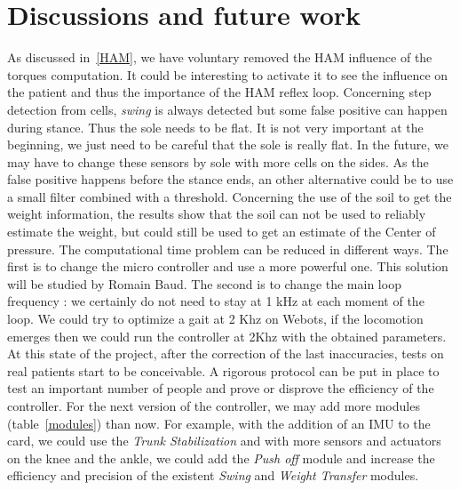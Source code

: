 \documentclass[a4paper,12pt]{article}
\begin{document}
\section{Discussions and future work}

As discussed in~\ref{HAM}, we have voluntary removed the HAM influence of the torques computation. It could be interesting to activate it to see the influence on the patient and thus the importance of the HAM reflex loop.
\medbreak
Concerning step detection from cells, \textit{swing} is always detected but some false positive can happen during stance. Thus the sole needs to be flat. It is not very important at the beginning, we just need to be careful that the sole is really flat. In the future, we may have to change these sensors by sole with more cells on the sides. %
As the false positive happens before the stance ends, an other alternative could be to use a small filter combined with a threshold.
Concerning the use of the soil to get the weight information, the results show that the soil can not be used to reliably estimate the weight, but could still be used to get an estimate of the Center of pressure.
\medbreak
The computational time problem can be reduced in different ways. The first is to change the micro controller and use a more powerful one. %
This solution will be studied by Romain Baud. The second is to change the main loop frequency : we certainly do not need to stay at 1 kHz at each moment of the loop. We could try to optimize a gait at 2 Khz on Webots, if the locomotion emerges then we could run the controller at 2Khz with the obtained parameters.
\label{discussions}
\medbreak
At this state of the project, after the correction of the last inaccuracies, tests on real patients start to be conceivable. A rigorous protocol can be put in place to test an important number of people and prove or disprove the efficiency of the controller.
\medbreak
For the next version of the controller, we may add more modules (table~\ref{modules}) than now. For example, with the addition of an IMU to the card, we could use the \textit{Trunk Stabilization} and with more sensors and actuators on the knee and the ankle, we could add the \textit{Push off} module and  increase the efficiency and precision of the existent \textit{Swing} and \textit{Weight Transfer} modules.
\end{document}
